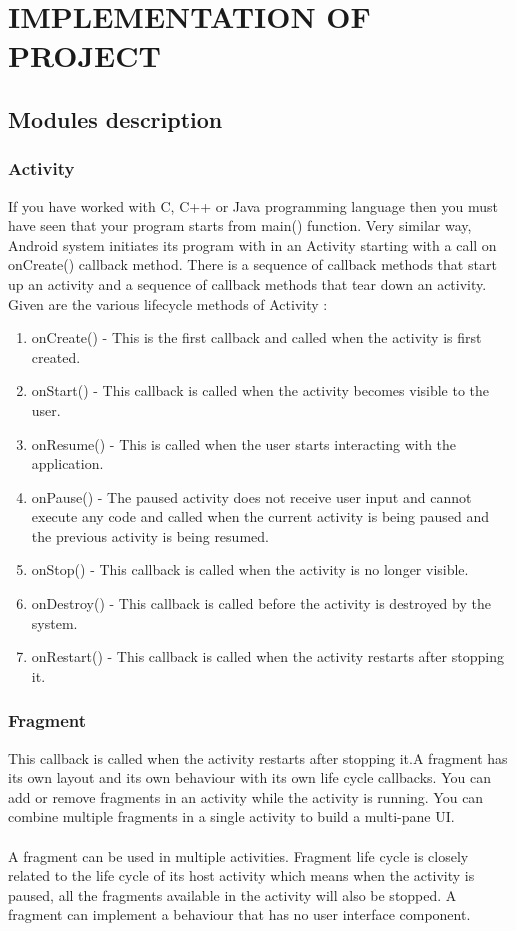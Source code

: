 \documentclass[a4paper, 12pt]{report}
\begin{document}
\chapter{IMPLEMENTATION OF PROJECT}
\section{Modules description}
\subsection{Activity}
\hspace{0.8cm}If you have worked with C, C++ or Java programming language then you must have seen that your program starts from main() function. Very similar way, Android system initiates its program with in an Activity starting with a call on onCreate() callback method. There is a sequence of callback methods that start up an activity and a sequence of callback methods that tear down an activity.
\\\hspace*{0.8cm}Given are the various lifecycle methods of Activity : 
\begin{enumerate}
\item onCreate() - This is the first callback and called when the activity is first created.
\item onStart() - This callback is called when the activity becomes visible to the user.
\item onResume() - This is called when the user starts interacting with the application.
\item onPause() - The paused activity does not receive user input and cannot execute any code and called when the current activity is being paused and the previous activity is being resumed.
\item onStop() - This callback is called when the activity is no longer visible.
\item onDestroy() - This callback is called before the activity is destroyed by the system.
\item onRestart() - This callback is called when the activity restarts after stopping it.
\end{enumerate}
\subsection{Fragment}
\hspace{0.8cm}This callback is called when the activity restarts after stopping it.A fragment has its own layout and its own behaviour with its own life cycle callbacks. You can add or remove fragments in an activity while the activity is running. You can combine multiple fragments in a single activity to build a multi-pane UI.\\\\
\hspace*{0.8cm}A fragment can be used in multiple activities. Fragment life cycle is closely related to the life cycle of its host activity which means when the activity is paused, all the fragments available in the activity will also be stopped. A fragment can implement a behaviour that has no user interface component.
\end{document}
